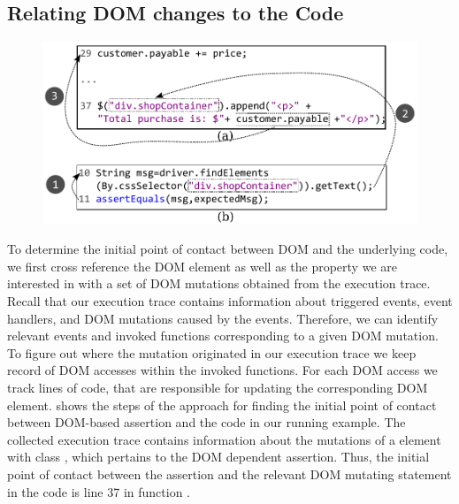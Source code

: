 \subsection{Relating DOM changes to the \javascript Code} \label{Sec:domToCode}
%
\begin{figure}[!t]
  \centering
  \includegraphics[width=1\hsize]{fig/assertionToCode}
  \vspace{-0.1in} 
  \label{Fig:assertionToCode}
  \vspace{-0.1in} 
\end{figure}
To determine the initial point of contact between DOM and the underlying \javascript code, we first cross reference the DOM element as well as the property we are interested in with a set of DOM mutations obtained from the execution trace. Recall that our execution trace contains information about triggered events, event handlers, and DOM mutations caused by the events. Therefore, we can identify relevant events and invoked functions corresponding to a given DOM mutation. To figure out where the mutation originated in our execution trace we keep record of DOM accesses within the invoked functions. For each DOM access we track \javascript lines of code, that are responsible for updating the corresponding DOM element.
 shows the steps of the approach for finding the initial point of contact between DOM-based assertion and the \javascript code in our running example. The collected execution trace contains information about the mutations of a  element with class , which pertains to the DOM dependent assertion. Thus, the initial point of contact between the assertion and the relevant DOM mutating statement in the \javascript code is line 37 in function .

